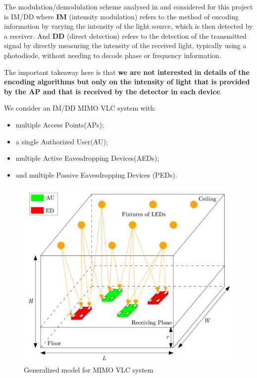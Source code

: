 \documentclass[a4paper,12pt,twoside]{article}
\begin{document}
	The modulation/demodulation scheme analysed in \cite{Oxford2021} and considered for this project is IM/DD where \textbf{IM} (intensity modulation) refers to the method of encoding information by varying the intensity of the light source, which is then detected by a receiver. And \textbf{DD} (direct detection) refers to the detection of the transmitted signal by directly measuring the intensity of the received light, typically using a photodiode, without needing to decode phase or frequency information.
	
	The important takeaway here is that \textbf{we are not interested in details of the encoding algorithms but only on the intensity of light that is provided by the AP and that is received by the detector in each device}.
	
	We consider an IM/DD MIMO VLC system with:
	\begin{itemize}
		\item multiple Access Points(APs);
		\item a single Authorized User(AU);
		\item multiple Active Eavesdropping Devices(AEDs);
		\item and multiple Passive Eavesdropping Devices (PEDs).
	\end{itemize}
	
	\begin{figure}[h!]
		\centering
		\includegraphics[scale=0.5]{../modelisation.PNG}
		\caption{Generalized model for MIMO VLC system \cite{Edinburgh2020}}
	\end{figure}
	
\end{document}
